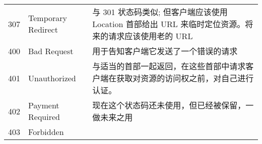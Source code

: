 \begin{longtable}[]{@{}cll@{}}
\begin{minipage}[t]{0.32\columnwidth}
307\strut
\end{minipage} & \begin{minipage}[t]{0.30\columnwidth}\raggedright\strut
Temporary Redirect\strut
\end{minipage} & \begin{minipage}[t]{0.30\columnwidth}\raggedright\strut
与 301 状态码类似; 但客户端应该使用 Location 首部给出 URL
来临时定位资源。将来的请求应该使用老的 URL\strut
\end{minipage}\tabularnewline
\begin{minipage}[t]{0.32\columnwidth}\centering\strut
400\strut
\end{minipage} & \begin{minipage}[t]{0.30\columnwidth}\raggedright\strut
Bad Request\strut
\end{minipage} & \begin{minipage}[t]{0.30\columnwidth}\raggedright\strut
用于告知客户端它发送了一个错误的请求\strut
\end{minipage}\tabularnewline
\begin{minipage}[t]{0.32\columnwidth}\centering\strut
401\strut
\end{minipage} & \begin{minipage}[t]{0.30\columnwidth}\raggedright\strut
Unauthorized\strut
\end{minipage} & \begin{minipage}[t]{0.30\columnwidth}\raggedright\strut
与适当的首部一起返回，在这些首部中请求客户端在获取对资源的访问权之前，对自己进行认证。\strut
\end{minipage}\tabularnewline
\begin{minipage}[t]{0.32\columnwidth}\centering\strut
402\strut
\end{minipage} & \begin{minipage}[t]{0.30\columnwidth}\raggedright\strut
Payment Required\strut
\end{minipage} & \begin{minipage}[t]{0.30\columnwidth}\raggedright\strut
现在这个状态码还未使用，但已经被保留，一做未来之用\strut
\end{minipage}\tabularnewline
\begin{minipage}[t]{0.32\columnwidth}\centering\strut
403\strut
\end{minipage} & \begin{minipage}[t]{0.30\columnwidth}\raggedright\strut
Forbidden\strut
\end{minipage} & \begin{minipage}[t]{0.30\columnwidth}\raggedright\strut

\end{minipage}
\end{longtable}
